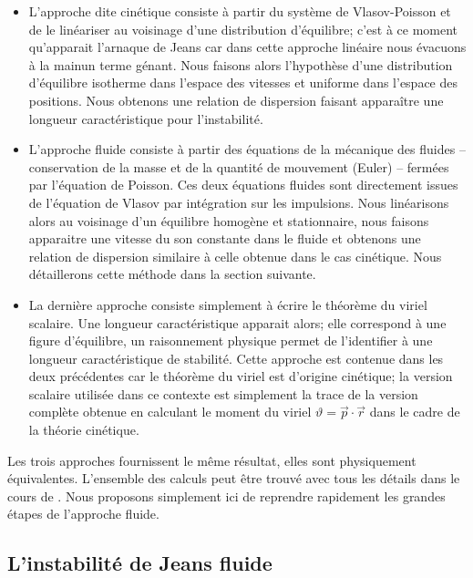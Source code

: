\begin{itemize}

	\item L'approche dite cinétique consiste à partir du système de Vlasov-Poisson et de le linéariser au voisinage d'une distribution
		d'équilibre; c'est à ce moment qu'apparait l'arnaque de Jeans car dans cette approche linéaire nous évacuons \og{}à la main\fg un terme génant.
		Nous faisons alors l'hypothèse d'une distribution d'équilibre isotherme dans l'espace des vitesses et uniforme dans l'espace des
		positions. Nous obtenons une relation de dispersion faisant apparaître une longueur caractéristique pour l'instabilité.

	\item L'approche fluide consiste à partir des équations de la mécanique des fluides  -- conservation de la masse et de la quantité de
		mouvement (Euler) -- fermées par l'équation de Poisson. Ces deux équations fluides sont directement issues de l'équation de Vlasov par
		intégration sur les impulsions. Nous linéarisons alors au voisinage d'un équilibre homogène et stationnaire, nous faisons apparaitre
		une vitesse du son constante dans le fluide et obtenons une relation de dispersion similaire à celle obtenue dans le cas
		cinétique. Nous détaillerons cette méthode dans la section suivante.

	\item La dernière approche consiste simplement à écrire le théorème du viriel scalaire. Une longueur caractéristique apparait alors; elle
		correspond  à une figure d'équilibre, un raisonnement physique permet de l'identifier à une longueur caractéristique de stabilité.
		Cette approche est contenue dans les deux précédentes car le théorème du viriel est d'origine cinétique; la version scalaire utilisée
		dans ce contexte est simplement la trace de la version complète obtenue en calculant le moment du viriel $\vartheta=\vec p \cdot \vec
		r$ dans le cadre de la théorie cinétique.

\end{itemize}

Les trois approches fournissent le même résultat, elles sont physiquement
équivalentes. L'ensemble des calculs peut être trouvé avec tous les détails dans le cours de \cite{CoursJP}. Nous proposons simplement ici
de reprendre rapidement les grandes étapes de l'approche fluide.

\subsection{L'instabilité de Jeans fluide}

